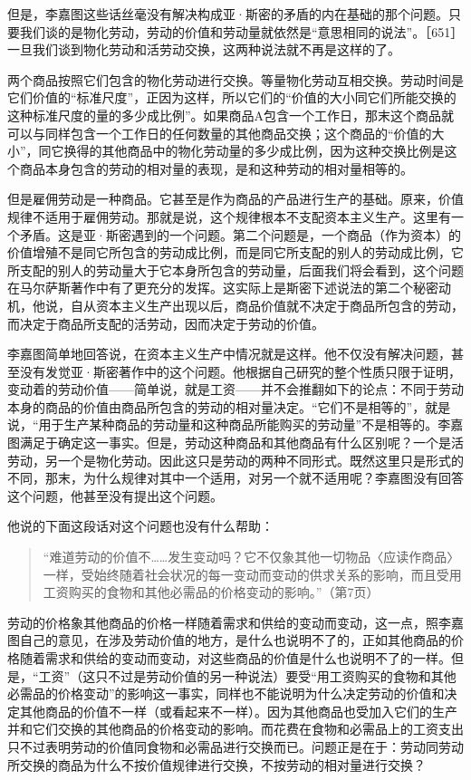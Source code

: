但是，李嘉图这些话丝毫没有解决构成亚·斯密的矛盾的内在基础的那个问题。只要我们谈的是物化劳动，劳动的价值和劳动量就依然是“意思相同的说法”。［651］一旦我们谈到物化劳动和活劳动交换，这两种说法就不再是这样的了。

两个商品按照它们包含的物化劳动进行交换。等量物化劳动互相交换。劳动时间是它们价值的“标准尺度”，正因为这样，所以它们的“价值的大小同它们所能交换的这种标准尺度的量的多少成比例”。如果商品A包含一个工作日，那末这个商品就可以与同样包含一个工作日的任何数量的其他商品交换；这个商品的“价值的大小”，同它换得的其他商品中的物化劳动量的多少成比例，因为这种交换比例是这个商品本身包含的劳动的相对量的表现，是和这种劳动的相对量相等的。

但是雇佣劳动是一种商品。它甚至是作为商品的产品进行生产的基础。原来，价值规律不适用于雇佣劳动。那就是说，这个规律根本不支配资本主义生产。这里有一个矛盾。这是亚·斯密遇到的一个问题。第二个问题是，一个商品（作为资本）的价值增殖不是同它所包含的劳动成比例，而是同它所支配的别人的劳动成比例，它所支配的别人的劳动量大于它本身所包含的劳动量，后面我们将会看到，这个问题在马尔萨斯著作中有了更充分的发挥。这实际上是斯密下述说法的第二个秘密动机，他说，自从资本主义生产出现以后，商品价值就不决定于商品所包含的劳动，而决定于商品所支配的活劳动，因而决定于劳动的价值。

李嘉图简单地回答说，在资本主义生产中情况就是这样。他不仅没有解决问题，甚至没有发觉亚·斯密著作中的这个问题。他根据自己研究的整个性质只限于证明，变动着的劳动价值——简单说，就是工资——并不会推翻如下的论点：不同于劳动本身的商品的价值由商品所包含的劳动的相对量决定。“它们不是相等的”，就是说，“用于生产某种商品的劳动量和这种商品所能购买的劳动量”不是相等的。李嘉图满足于确定这一事实。但是，劳动这种商品和其他商品有什么区别呢？一个是活劳动，另一个是物化劳动。因此这只是劳动的两种不同形式。既然这里只是形式的不同，那末，为什么规律对其中一个适用，对另一个就不适用呢？李嘉图没有回答这个问题，他甚至没有提出这个问题。

他说的下面这段话对这个问题也没有什么帮助：

\begin{quote}{“难道劳动的价值不……发生变动吗？它不仅象其他一切物品〈应读作商品〉一样，受始终随着社会状况的每一变动而变动的供求关系的影响，而且受用工资购买的食物和其他必需品的价格变动的影响。”（第7页）}\end{quote}

劳动的价格象其他商品的价格一样随着需求和供给的变动而变动，这一点，照李嘉图自己的意见，在涉及劳动价值的地方，是什么也说明不了的，正如其他商品的价格随着需求和供给的变动而变动，对这些商品的价值是什么也说明不了的一样。但是，“工资”（这只不过是劳动价值的另一种说法）要受“用工资购买的食物和其他必需品的价格变动”的影响这一事实，同样也不能说明为什么决定劳动的价值和决定其他商品的价值不一样（或看起来不一样）。因为其他商品也受加入它们的生产并和它们交换的其他商品的价格变动的影响。而花费在食物和必需品上的工资支出只不过表明劳动的价值同食物和必需品进行交换而已。问题正是在于：劳动同劳动所交换的商品为什么不按价值规律进行交换，不按劳动的相对量进行交换？


